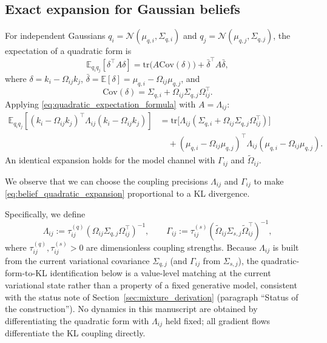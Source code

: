\documentclass[11pt]{article}
\begin{document}
\subsection{Exact expansion for Gaussian beliefs}
For independent Gaussians $q_i = \mathcal{N}(\mu_{q,i},\Sigma_{q,i})$ and $q_j = \mathcal{N}(\mu_{q,j},\Sigma_{q,j})$, the expectation of a quadratic form is
\begin{equation}
\mathbb{E}_{q_i q_j}[\delta^\top A \delta]
= \mathrm{tr}\big(A\mathrm{Cov}(\delta)\big)
+ \bar{\delta}^\top A \bar{\delta},
\label{eq:quadratic_expectation_formula}
\end{equation}
where $\delta = k_i - \Omega_{ij}k_j$, $\bar{\delta} = \mathbb{E}[\delta] = \mu_{q,i} - \Omega_{ij}\mu_{q,j}$, and
\begin{equation}
\mathrm{Cov}(\delta) = \Sigma_{q,i} + \Omega_{ij}\Sigma_{q,j}\Omega_{ij}^\top.
\end{equation}
Applying \eqref{eq:quadratic_expectation_formula} with $A = \Lambda_{ij}$:
\begin{equation}
\begin{aligned}
\mathbb{E}_{q_i q_j}
[(k_i-\Omega_{ij}k_j)^\top\Lambda_{ij}(k_i-\Omega_{ij}k_j)]
&=\mathrm{tr}\big[\Lambda_{ij}(\Sigma_{q,i}+\Omega_{ij}\Sigma_{q,j}\Omega_{ij}^\top)\big]\\
&\quad+(\mu_{q,i}-\Omega_{ij}\mu_{q,j})^\top
\Lambda_{ij}
(\mu_{q,i}-\Omega_{ij}\mu_{q,j}).
\end{aligned}
\label{eq:belief_quadratic_expansion}
\end{equation}
An identical expansion holds for the model channel with $\Gamma_{ij}$ and $\tilde{\Omega}_{ij}$.

We observe that we can choose the coupling precisions $\Lambda_{ij}$ and $\Gamma_{ij}$ to make \eqref{eq:belief_quadratic_expansion} proportional to a KL divergence.

Specifically, we define
\begin{equation}
\Lambda_{ij}:=\tau^{(q)}_{ij}(\Omega_{ij}\Sigma_{q,j}\Omega_{ij}^\top)^{-1},
\qquad
\Gamma_{ij}:=\tau^{(s)}_{ij}(\tilde{\Omega}_{ij}\Sigma_{s,j}\tilde{\Omega}_{ij}^\top)^{-1},
\end{equation}
where $\tau^{(q)}_{ij}, \tau^{(s)}_{ij} > 0$ are dimensionless coupling strengths. Because $\Lambda_{ij}$ is built from the current variational covariance $\Sigma_{q,j}$ (and $\Gamma_{ij}$ from $\Sigma_{s,j}$), the quadratic-form-to-KL identification below is a value-level matching at the current variational state rather than a property of a fixed generative model, consistent with the status note of Section~\ref{sec:mixture_derivation} (paragraph ``Status of the construction''). No dynamics in this manuscript are obtained by differentiating the quadratic form with $\Lambda_{ij}$ held fixed; all gradient flows differentiate the KL coupling directly.
\end{document}
